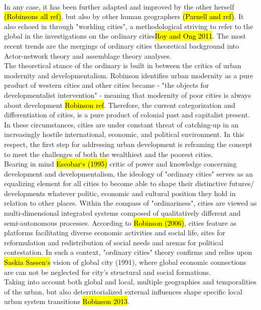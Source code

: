 \documentclass[11pt]{report}
\begin{document}
\\
In any case, it has been further adapted and improved by the other herself \hl{(Robinsons all ref)}, but also by other human geographers \hl{(Parnell and ref)}. It also echoed in through "worlding cities", a methodological striving to refer to the global in the investigations on the ordinary cities\hl{Roy and Ong 2011}. The most recent trends are the mergings of ordinary cities theoretical background into Actor-network theory and assemblage theory analyses.
\\
The theoretical stance of the ordinary is built in between the critics of urban modernity and developmentalism.
Robinson identifies urban modernity as a pure product of western cities and other cities became - "the objects for developmentalist intervention" - meaning that modernity of poor cities is always about development \hl{Robinson ref}.
Therefore, the current categorization  and  differentiation  of  cities, is a pure product of colonial past and capitalist present. 
In these circumstances, cities are under constant threat of catching-up in an increasingly hostile 
international, economic, and political environment. 
In this respect, the first step for addressing urban  development  is reframing the concept to   meet  the challenges  of  both  the  wealthiest  and  the  poorest  cities.
\\
Bearing  in  mind  \hl{Escobar‘s (1995)} critic  of  power  and  knowledge  concerning  development  and 
developmentalism, the  ideology  of  "ordinary  cities"  serves as an equalizing  element  for  all  cities  to  become  able  to  shape  their  distinctive  futures/  developments whatever politic, economic and cultural position they hold in relation to other places. 
Within  the  compass  of  "ordinariness",  cities are viewed  as  multi-dimensional  integrated  systems 
composed of qualitatively different and semi-autonomous processes.
According to  \hl{Robinson (2006)}, cities feature as  platforms facilitating  diverse  economic  activities  and  social  life,  sites for  reformulation  and 
redistribution of social needs and arenas for political contestation. In such a context, "ordinary cities" theory confirms and relies upon \hl{Saskia Sassen‘s}  vision of global city (1991), where global economic connections are  can not be neglected for city's structural  and  social  formations.
\\
Taking into account both global and local, multiple geographies and temporalities of the urban, but also deterritorialized external influences shape specific local urban system transitions \hl{Robinson 2013}.
\end{document}

